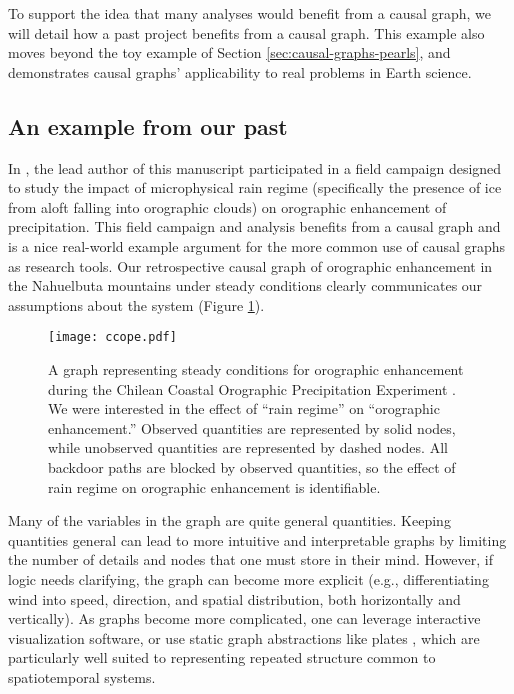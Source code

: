 \documentclass[12pt]{article}
\begin{document}
To support the idea that many analyses would benefit from a causal
graph, we will detail how a past project benefits from a causal
graph. This example also moves beyond the toy example of Section
\ref{sec:causal-graphs-pearls}, and demonstrates causal graphs'
applicability to real problems in Earth science.

\subsection{An example from our past}

In \citet{massmann2017}, the lead author of this manuscript
participated in a field campaign designed to study the impact of
microphysical rain regime (specifically the presence of ice from aloft
falling into orographic clouds) on orographic enhancement of
precipitation. This field campaign and analysis benefits from a causal
graph and is a nice real-world example argument for the more common
use of causal graphs as research tools. Our retrospective causal
graph of orographic enhancement in the Nahuelbuta mountains under
steady conditions clearly communicates our assumptions about the
system (Figure \ref{fig:ccope}).

\begin{figure}
  \texttt{[image: ccope.pdf]}
  \caption{A graph representing steady conditions for orographic
    enhancement during the Chilean Coastal Orographic Precipitation
    Experiment \citep[CCOPE,][]{massmann2017}. We were interested in
    the effect of ``rain regime'' on ``orographic enhancement.''
    Observed quantities are represented by solid nodes, while
    unobserved quantities are represented by dashed nodes. All backdoor
    paths are blocked by observed quantities, so the effect of rain
    regime on orographic enhancement is identifiable.}
  \label{fig:ccope}
\end{figure}

Many of the variables in the graph are quite general
quantities. Keeping quantities general can lead to more intuitive and
interpretable graphs by limiting the number of details and nodes that
one must store in their mind. However, if logic needs clarifying, the
graph can become more explicit (e.g., differentiating wind into speed,
direction, and spatial distribution, both horizontally and
vertically). As graphs become more complicated, one can leverage
interactive visualization software, or use static graph abstractions
like plates \citep{bishop2006pattern}, which are particularly well
suited to representing repeated structure common to spatiotemporal
systems.
\end{document}
